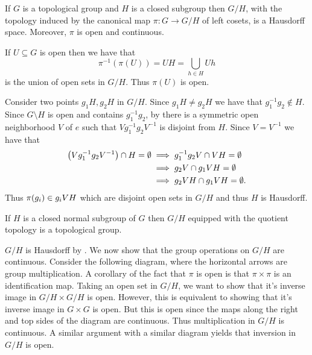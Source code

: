 \documentclass[letterpaper, 11pt, oneside]{book}
\begin{document}
\begin{prop}\label{prop: quotient_hausdorff}
  If $G$ is a topological group and $H$ is a closed subgroup then $G / H$, with the topology induced by the canonical map $\pi\colon G \to G / H$ of left cosets, is a Hausdorff space.
  Moreover, $\pi$ is open and continuous.
\end{prop}
\begin{pf}
  If $U \subseteq G$ is open then we have that
  \[
    \pi^{-1}(\pi(U)) = UH = \bigcup_{h \in H} Uh
  \]
  is the union of open sets in $G / H$.
  Thus $\pi(U)$ is open.

  Consider two points $g_{1}H, g_{2}H$ in $G / H$.
  Since $g_{1}H \neq g_{2}H$ we have that $g_{1}^{-1}g_{2} \notin H$.
  Since $G \setminus H$ is open and contains $g_{1}^{-1} g_{2}$, by  there is a symmetric open neighborhood $V$ of $e$ such that $V g_{1}^{-1} g_{2} V^{-1}$ is disjoint from $H$.
  Since $V = V^{-1}$ we have that
  \begin{align*}
    \pqty{V g_{1}^{-1} g_{2} V^{-1}} \cap H = \emptyset &\implies g_{1}^{-1} g_{2} V \cap VH = \emptyset \\
                                                        &\implies g_{2} V \cap g_{1} VH = \emptyset \\
                                                        &\implies g_{2} V H \cap g_{1} V H = \emptyset.
  \end{align*}
  Thus $\pi\pqty{g_{i}} \in g_{i} VH$ which are disjoint open sets in $G / H$ and thus $H$ is Hausdorff.
\end{pf}

\begin{prop}
  If $H$ is a closed normal subgroup of $G$ then $G / H$ equipped with the quotient topology is a topological group.
\end{prop}
\begin{pf}
  $G / H$ is Hausdorff by .
  We now show that the group operations on $G / H$ are continuous.
  Consider the following diagram, where the horizontal arrows are group multiplication.
  A corollary of the fact that $\pi$ is open is that $\pi \times \pi$ is an identification map.
  Taking an open set in $G / H$, we want to show that it's inverse image in $G / H \times G / H$ is open.
  However, this is equivalent to showing that it's inverse image in $G \times G$ is open.
  But this is open since the maps along the right and top sides of the diagram are continuous.
  Thus multiplication in $G / H$ is continuous.
  A similar argument with a similar diagram yields that inversion in $G / H$ is open.
\end{pf}
\end{document}

